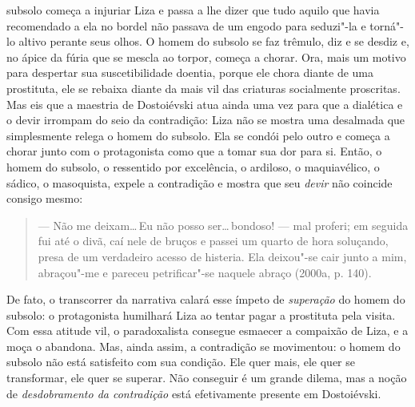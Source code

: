 subsolo começa a injuriar Liza e passa a lhe dizer que tudo aquilo que
havia recomendado a ela no bordel não passava de um engodo para
seduzi"-la e torná"-lo altivo perante seus olhos. O homem do subsolo se
faz trêmulo, diz e se desdiz e, no ápice da fúria que se mescla ao
torpor, começa a chorar. Ora, mais um motivo para despertar sua
suscetibilidade doentia, porque ele chora diante de uma prostituta, ele
se rebaixa diante da mais vil das criaturas socialmente proscritas. Mas
eis que a maestria de Dostoiévski atua ainda uma vez para que a
dialética e o devir irrompam do seio da contradição: Liza não se mostra
uma desalmada que simplesmente relega o homem do subsolo. Ela se condói
pelo outro e começa a chorar junto com o protagonista como que a tomar
sua dor para si. Então, o homem do subsolo, o ressentido por excelência,
o ardiloso, o maquiavélico, o sádico, o masoquista, expele a contradição
e mostra que seu \emph{devir} não coincide consigo mesmo:

\begin{quote}
--- Não me deixam\ldots \,Eu não posso ser\ldots \,bondoso! --- mal proferi; em
seguida fui até o divã, caí nele de bruços e passei um quarto de hora
soluçando, presa de um verdadeiro acesso de histeria. Ela deixou"-se cair
junto a mim, abraçou"-me e pareceu petrificar"-se naquele abraço (2000a,
p. 140).
\end{quote}

De fato, o transcorrer da narrativa calará esse ímpeto de
\emph{superação} do homem do subsolo: o protagonista humilhará Liza ao
tentar pagar a prostituta pela visita. Com essa atitude vil, o
paradoxalista consegue esmaecer a compaixão de Liza, e a moça o
abandona. Mas, ainda assim, a contradição se movimentou: o homem do
subsolo não está satisfeito com sua condição. Ele quer mais, ele quer se
transformar, ele quer se superar. Não conseguir é um grande dilema, mas
a noção de \emph{desdobramento da contradição} está efetivamente
presente em Dostoiévski.

